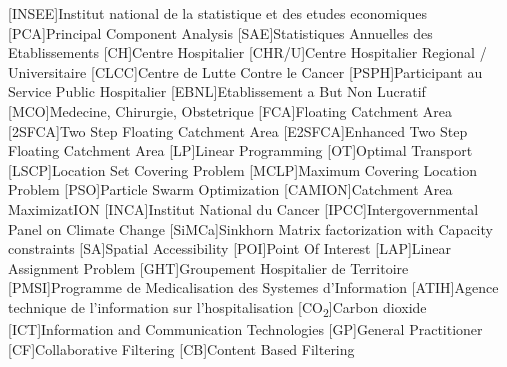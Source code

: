 \begin{multicols}{2}

\begin{acronym}
        [INSEE]{Institut national de la statistique et des etudes economiques}
        [PCA]{Principal Component Analysis}
        [SAE]{Statistiques Annuelles des Etablissements}
        [CH]{Centre Hospitalier}
        [CHR/U]{Centre Hospitalier Regional / Universitaire}
        [CLCC]{Centre de Lutte Contre le Cancer}
        [PSPH]{Participant au Service Public Hospitalier }
        [EBNL]{Etablissement a But Non Lucratif}
        [MCO]{Medecine, Chirurgie, Obstetrique}
        [FCA]{Floating Catchment Area}
        [2SFCA]{Two Step Floating Catchment Area}
        [E2SFCA]{Enhanced Two Step Floating Catchment Area}
        [LP]{Linear Programming}
        [OT]{Optimal Transport}
        [LSCP]{Location Set Covering Problem}
        [MCLP]{Maximum Covering Location Problem}
        [PSO]{Particle Swarm Optimization}
        [CAMION]{Catchment Area MaximizatION}
        [INCA]{Institut National du Cancer}
        [IPCC]{Intergovernmental Panel on Climate Change}
        [SiMCa]{Sinkhorn Matrix factorization with Capacity constraints}
        [SA]{Spatial Accessibility}
        [POI]{Point Of Interest}
        [LAP]{Linear Assignment Problem}
        [GHT]{Groupement Hospitalier de Territoire}
        [PMSI]{Programme de Medicalisation des Systemes d'Information}
        [ATIH]{Agence technique de l'information sur l'hospitalisation}
        [CO\textsubscript{2}]{Carbon dioxide}
        [ICT]{Information and Communication Technologies}
        [GP]{General Practitioner}
        [CF]{Collaborative Filtering}
        [CB]{Content Based Filtering}
\end{acronym}

\end{multicols}
